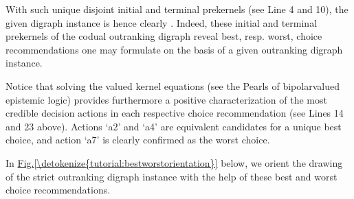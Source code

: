 \documentclass[a4paper,12pt,english]{sphinxhowto}
\begin{document}
With such unique disjoint initial and terminal prekernels (see Line 4 and 10), the given digraph instance is hence clearly . Indeed, these initial and terminal prekernels of the codual outranking digraph reveal best, resp. worst, choice recommendations one may formulate on the basis of a given outranking digraph instance.

\begin{sphinxVerbatim}[commandchars=\\\{\},numbers=left,firstnumber=1,stepnumber=1]
\end{sphinxVerbatim}

Notice that solving the valued  kernel equations (see the Pearls of bipolar\sphinxhyphen{}valued epistemic logic) provides furthermore a positive characterization of the most credible decision actions in each respective choice recommendation (see Lines 14 and 23 above). Actions ‘a2’ and ‘a4’ are equivalent candidates for a unique best choice, and action ‘a7’ is clearly confirmed as the worst choice.

In \hyperref[\detokenize{tutorial:bestworstorientation}]{Fig.\@ \ref{\detokenize{tutorial:bestworstorientation}}} below, we orient the drawing of the strict outranking digraph instance with the help of these best and worst choice recommendations.
\end{document}
